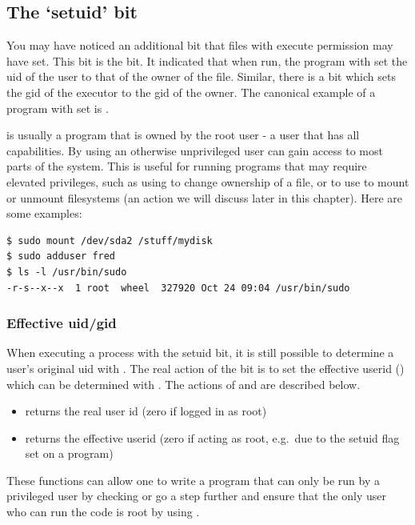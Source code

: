 \subsection{The `setuid' bit}

You may have noticed an additional bit that files with execute permission may have set. This bit is the  bit. It indicated that when run, the program with set the uid of the user to that of the owner of the file. Similar, there is a  bit which sets the gid of the executor to the gid of the owner. The canonical example of a program with  set is .

 is usually a program that is owned by the root user - a user that has all capabilities. By using  an otherwise unprivileged user can gain access to most parts of the system. This is useful for running programs that may require elevated privileges, such as using  to change ownership of a file, or to use  to mount or unmount filesystems (an action we will discuss later in this chapter). Here are some examples:

\begin{verbatim}
$ sudo mount /dev/sda2 /stuff/mydisk
$ sudo adduser fred
$ ls -l /usr/bin/sudo
-r-s--x--x  1 root  wheel  327920 Oct 24 09:04 /usr/bin/sudo
\end{verbatim}

\subsubsection{Effective uid/gid}

When executing a process with the setuid bit, it is still possible to determine a user's original uid with . The real action of the  bit is to set the effective userid () which can be determined with . The actions of  and  are described below.

\begin{itemize}
\tightlist
\item
   returns the real user id (zero if logged in as root)
\item
   returns the effective userid (zero if acting as root, e.g.~due to the setuid flag set on a program)
\end{itemize}

These functions can allow one to write a program that can only be run by a privileged user by checking  or go a step further and ensure that the only user who can run the code is root by using .

